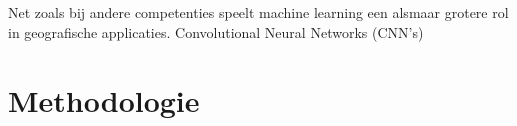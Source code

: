 




Net zoals bij andere competenties speelt machine learning een alsmaar grotere rol in geografische applicaties. 
Convolutional Neural Networks (CNN's) 


\section{Methodologie}%
\label{sec:methodologie}


